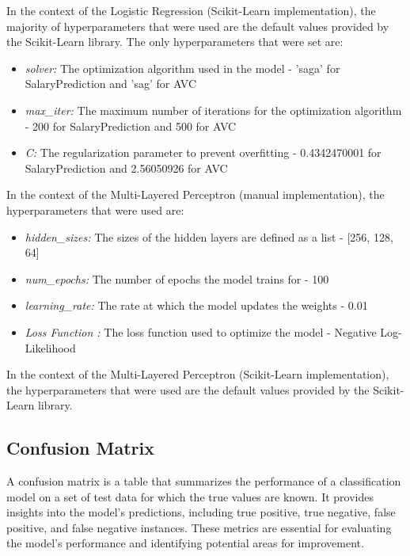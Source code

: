 \documentclass[runningheads]{paper}
\begin{document}
In the context of the Logistic Regression (Scikit-Learn implementation), the majority of
hyperparameters that were used are the default values provided by the Scikit-Learn
library. The only hyperparameters that were set are:


\begin{itemize}
    \item \textit{solver:} The optimization algorithm used in the model - 
    'saga' for SalaryPrediction and 'sag' for AVC
    \item \textit{max\_iter:} The maximum number of iterations for the optimization algorithm - 200 for SalaryPrediction and 500 for AVC
    \item \textit{C:} The regularization parameter to prevent overfitting - 0.4342470001 for SalaryPrediction and  2.56050926 for AVC
\end{itemize}

In the context of the Multi-Layered Perceptron (manual implementation), the
hyperparameters that were used are:

\begin{itemize}
    \item \textit{hidden\_sizes:} The sizes of the hidden layers are defined as a list - [256, 128, 64]
    \item \textit{num\_epochs:} The number of epochs the model trains for - 100
    \item \textit{learning\_rate:} The rate at which the model updates the weights - 0.01
    \item \textit{Loss Function	:} The loss function used to optimize the model - Negative Log-Likelihood
\end{itemize}

In the context of the Multi-Layered Perceptron (Scikit-Learn implementation), the 
hyperparameters that were used are the default values provided by the Scikit-Learn
library.

\subsection{Confusion Matrix}
A confusion matrix is a table that summarizes the performance of a classification
model on a set of test data for which the true values are known. It provides
insights into the model's predictions, including true positive, true negative,
false positive, and false negative instances. These metrics are essential for
evaluating the model's performance and identifying potential areas for improvement.
\end{document}
